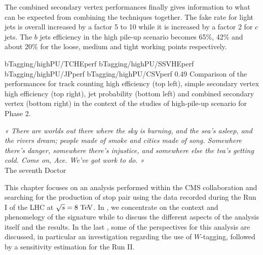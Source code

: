         The combined secondary vertex performances finally gives information to what can be
        expected from combining the techniques together. The fake rate for light jets
        is overall increased by a factor 5 to 10 while it is increased by a factor 2 for $c$ jets.
        The $b$ jets efficiency in the high pile-up scenario becomes 65\%, 42\% and about 20\%
        for the loose, medium and tight working points respectively.

                          {bTagging/highPU/TCHEperf}
                          {bTagging/highPU/SSVHEperf}
                          {bTagging/highPU/JPperf}
                          {bTagging/highPU/CSVperf}
                          {0.49}
                          {Comparison of the performances for track counting high efficiency
                          (top left), simple secondary vertex high efficiency (top right),
                          jet probability (bottom left) and combined secondary vertex
                          (bottom right) in the context of the studies of high-pile-up
                          scenario for Phase 2.}


\setcounter{mtc}{6}
\vspace*{-0.7cm}
\begin{center}
\begin{minipage}{0.95\textwidth}
\emph{« There are worlds out there where the sky is burning, and the sea’s asleep, and the rivers dream;
people made of smoke and cities made of song. Somewhere there’s danger, somewhere there’s injustice,
and somewhere else the tea’s getting cold. Come on, Ace. We’ve got work to do. »}\\
\hspace*{0.75\textwidth} The seventh Doctor
\end{minipage}
\end{center}

\minitoc
\newpage

    This chapter focuses on an analysis performed within the CMS collaboration
    and searching for the production of stop pair using the data recorded during
    the Run I of the LHC at $\sqrt{s} = 8~\text{TeV}$. In ,
    we concentrate on the context and phenomelogy of the signature while
     to  discuss
    the different aspects of the analysis itself and the results. In the last
    , some of the perspectives for this analysis
    are discussed, in particular an investigation regarding the use of $W$-tagging, followed
    by a sensitivity estimation for the Run II.

